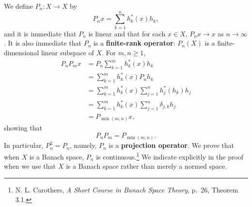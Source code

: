 \documentclass{article}
\theoremstyle{definition}
\theoremstyle{definition}
\begin{document}
We define $P_n:X \to X$ by
\[
P_n x=\sum_{k=1}^n h_k^*(x) h_k,
\]
 and it is immediate that $P_n$ is linear and that
for each $x \in X$, $P_nx \to x$ as $n \to \infty$. It is also immediate that $P_n$ is a \textbf{finite-rank operator}: $P_n(X)$ is a finite-dimensional linear subspace
of $X$.
For $m,n \geq 1$,
\begin{align*}
P_n P_m x &= P_n \sum_{k=1}^m h_k^*(x) h_k\\
& = \sum_{k=1}^m h_k^*(x) P_n h_k\\
&=\sum_{k=1}^m h_k^*(x) \sum_{j=1}^n h_j^*(h_k) h_j\\
&=\sum_{k=1}^m h_k^*(x) \sum_{j=1}^n \delta_{j,k} h_j\\
&=P_{\min(m,n)} x,
\end{align*}
showing that 
\[
P_n P_m = P_{\min(m,n)}.
\]
In particular, $P_n^2 = P_n$, namely, $P_n$ is a \textbf{projection operator}. 
We prove that when $X$ is a Banach space, $P_n$ is continuous.\footnote{N. L. Carothers, {\em A Short Course
in Banach Space Theory}, p.~26, Theorem 3.1.} We indicate explicitly in the proof
when we use that $X$ is a Banach space rather than merely a normed space. 
\end{document}
